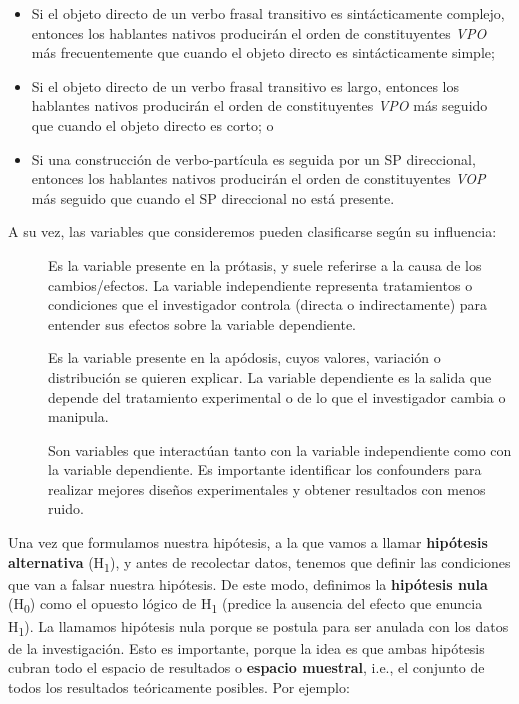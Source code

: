 \documentclass[authoryear,a4paper, 14pt]{scrartcl}
\begin{document}
\begin{itemize}
    \item
      Si el objeto directo de un verbo frasal
      transitivo es sintácticamente complejo, entonces los hablantes nativos
      producirán el orden de constituyentes \emph{VPO} más frecuentemente que
      cuando el objeto directo es sintácticamente simple;
    \item
      Si el objeto directo de un verbo frasal transitivo es largo, entonces
      los hablantes nativos producirán el orden de constituyentes \emph{VPO}
      más seguido que cuando el objeto directo es corto; o
    \item
      Si una construcción de verbo-partícula es seguida por un SP
      direccional, entonces los hablantes nativos producirán el orden de
      constituyentes \emph{VOP} más seguido que cuando el SP direccional no
      está presente.
\end{itemize}

A su vez, las variables que consideremos pueden clasificarse según su
influencia:

\begin{description}
    \item[\label=\small{Variable independiente:}]
    Es la variable presente en la prótasis, y suele referirse a la causa de
    los cambios/efectos. La variable independiente representa tratamientos o
    condiciones que el investigador controla (directa o indirectamente) para
    entender sus efectos sobre la variable dependiente.
    \item[\label=\small{Variable dependiente:}]
    Es la variable presente en la apódosis, cuyos valores, variación o
    distribución se quieren explicar. La variable dependiente es la salida
    que depende del tratamiento experimental o de lo que el investigador
    cambia o manipula.
    \item[\label=\small{Variables de confusión o \emph{confounders}:}]
    Son variables que interactúan tanto con la variable independiente como
    con la variable dependiente. Es importante identificar los confounders
    para realizar mejores diseños experimentales y obtener resultados con
    menos ruido.
\end{description}

Una vez que formulamos nuestra hipótesis, a la que vamos a llamar
\textbf{hipótesis} \textbf{alternativa} (H\textsubscript{1}), y antes de
recolectar datos, tenemos que definir las condiciones
que van a falsar nuestra hipótesis. De este modo, definimos la
\textbf{hipótesis nula} (H\textsubscript{0}) como el opuesto lógico de
H\textsubscript{1} (predice la ausencia del efecto que enuncia
H\textsubscript{1}). La llamamos hipótesis nula porque se postula para
ser anulada con los datos de la investigación. Esto es importante,
porque la idea es que ambas hipótesis cubran todo el espacio de
resultados o \textbf{espacio muestral}, i.e., el conjunto de todos los
resultados teóricamente posibles. Por ejemplo:
\end{document}
